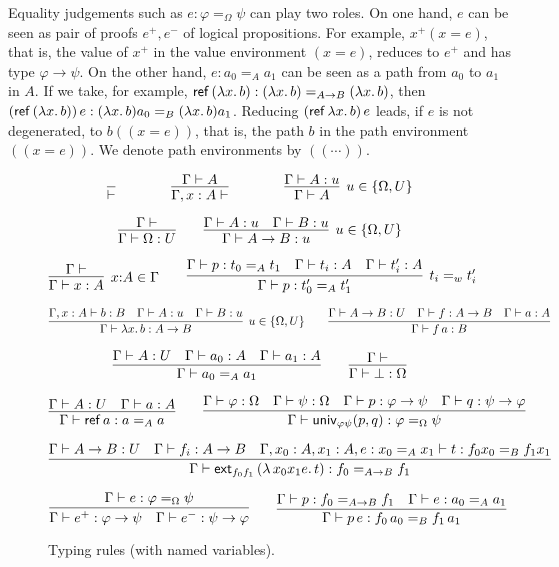 \documentclass[10pt,a4paper]{article}
\newcommand{\lam}[2]{\lambda{#1.\,#2}}
\newcommand{\pbr}[1]{(\!(#1)\!)}
\newcommand{\set}[1]{\{#1\}}
\newcommand{\unphsi}{{\univ_{\varphi\psi}}}
\newcommand{\extfs}{{\ext_{f_0 f_1}}}
\newcommand{\Ref}{{\sf ref}}
\newcommand{\ext}{{\sf ext}}
\newcommand{\univ}{{\sf univ}}
\begin{document}
Equality judgements such as $e: \varphi =_\Omega \psi$ can play two roles.
On one hand, $e$ can be seen as pair of proofs $e^+,e^-$ of logical propositions.
For example, $x^+(x{=}e)$, that is, 
the value of $x^+$ in the value environment $(x{=}e)$, 
reduces to $e^+$ and has type $\varphi\to\psi$. 
On the other hand, $e: a_0 =_A a_1$ can be seen as a path from $a_0$
to $a_1$ in $A$. If we take, for example, 
$\Ref\,(\lambda x.\,b) : (\lambda x.\,b) =_{A\to B} (\lambda x.\,b)$, then 
$(\Ref\,(\lambda x.\,b))\,e : (\lambda x.\,b) a_0 =_B (\lambda x.\,b) a_1$. 
Reducing $(\Ref\,\lambda x.\,b)\,e$ leads, if $e$ is not degenerated, 
to $b\pbr{x{=}e}$, that is, the path $b$ in the path environment $\pbr{x{=}e}$.
We denote path environments by $\pbr{\cdots}$.

\begin{figure}[h]
\[ \infer{\vdash}{} \quad\quad\quad\quad
\infer{\Gamma,x:A\vdash}{\Gamma\vdash A} \quad\quad\quad\quad
\infer[u\in\set{\Omega,U}]{\Gamma\vdash A}{\Gamma\vdash A:u} \]

\[ 
\infer{\Gamma\vdash{\Omega:U}}{\Gamma\vdash} \quad\quad
\infer[u\in\set{\Omega,U}]{\Gamma\vdash {A}\to{B} :u}{\Gamma\vdash A:u\quad\Gamma\vdash B:u}
\]

\[
\infer[x{:}A \in\Gamma]{\Gamma\vdash x:A}{\Gamma\vdash} \quad\quad
\infer[t_i =_{w} t'_i]{\Gamma\vdash p: t'_0 =_A t'_1}
{\Gamma\vdash p: t_0 =_A t_1 \quad \Gamma\vdash t_i : A \quad \Gamma\vdash t'_i : A }
\]

\[ 
\infer[u\in\set{\Omega,U}]{\Gamma\vdash\lam{x}{b}:{A}\to{B}}
{\Gamma,x:A\vdash b:B \quad \Gamma \vdash A:u \quad \Gamma \vdash B:u} 
\quad\quad
\infer{\Gamma\vdash f\,a:B}
  {\Gamma\vdash {A}\to{B}:U\quad\Gamma\vdash f:{A}\to{B}\quad\Gamma\vdash a:A} 
\]

\[
\infer{\Gamma\vdash a_0 =_A a_1}
{\Gamma\vdash A:U \quad \Gamma\vdash a_0:A \quad \Gamma\vdash a_1:A}\quad\quad
\infer{\Gamma\vdash \bot:\Omega}{\Gamma\vdash}
\]

\[ 
\infer{\Gamma\vdash\Ref\,a: a =_A a}{\Gamma\vdash A:U \quad \Gamma\vdash a:A} 
\quad\quad
\infer{\Gamma\vdash\unphsi(p,q):\varphi =_\Omega \psi}
{\Gamma\vdash \varphi:\Omega\quad \Gamma\vdash \psi:\Omega\quad
\Gamma\vdash p:\varphi\to\psi\quad \Gamma\vdash q:\psi\to\varphi} 
\]

\[
\infer{\Gamma\vdash \extfs\,(\lambda\,x_0 x_1 e.\,t): f_0 =_{A\to B} f_1}
{\Gamma\vdash A\to B :U \quad\Gamma\vdash f_i: A\to B \quad
\Gamma,x_0:A,x_1:A,e: x_0 =_A x_1 \vdash t: f_0 x_0 =_B f_1 x_1} 
\]

\[
\infer{\Gamma\vdash e^+: \varphi\to\psi \quad \Gamma\vdash e^-: \psi\to\varphi} 
{\Gamma\vdash e: \varphi =_{\Omega} \psi}
\quad\quad
\infer{\Gamma\vdash p\,e: f_0\,a_0 =_B f_1\,a_1} 
  {\Gamma\vdash p: f_0 =_{A\to B} f_1 \quad \Gamma\vdash e : a_0 =_A a_1}
\]
\caption{Typing rules (with named variables).
\label{typing_rules}}
\end{figure}
\end{document}

